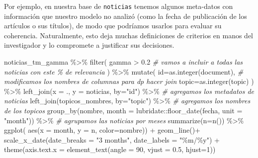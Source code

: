 \documentclass[
]{book}
\newenvironment{Shaded}{\begin{snugshade}}{\end{snugshade}}
\newcommand{\AttributeTok}[1]{\textcolor[rgb]{0.77,0.63,0.00}{#1}}
\newcommand{\CommentTok}[1]{\textcolor[rgb]{0.56,0.35,0.01}{\textit{#1}}}
\newcommand{\DecValTok}[1]{\textcolor[rgb]{0.00,0.00,0.81}{#1}}
\newcommand{\FloatTok}[1]{\textcolor[rgb]{0.00,0.00,0.81}{#1}}
\newcommand{\FunctionTok}[1]{\textcolor[rgb]{0.00,0.00,0.00}{#1}}
\newcommand{\NormalTok}[1]{#1}
\newcommand{\SpecialCharTok}[1]{\textcolor[rgb]{0.00,0.00,0.00}{#1}}
\newcommand{\StringTok}[1]{\textcolor[rgb]{0.31,0.60,0.02}{#1}}
\begin{document}
Por ejemplo, en nuestra base de \texttt{noticias} tenemos algunos meta-datos con información que nuestro modelo no analizó (como la fecha de publicación de los artículos o sus títulos), de modo que podríamos usarlos para evaluar su coherencia. Naturalmente, esto deja muchas definiciones de criterios en manos del investigador y lo compromete a justificar sus decisiones.

\begin{Shaded}
\begin{Highlighting}[]
\NormalTok{noticias\_tm\_gamma }\SpecialCharTok{\%\textgreater{}\%}
  \FunctionTok{filter}\NormalTok{(}
\NormalTok{    gamma }\SpecialCharTok{\textgreater{}} \FloatTok{0.2} \CommentTok{\# vamos a incluir a todas las noticias con este \% de relevancia}
\NormalTok{    ) }\SpecialCharTok{\%\textgreater{}\%} 
  \FunctionTok{mutate}\NormalTok{(}
    \AttributeTok{id=}\FunctionTok{as.integer}\NormalTok{(document), }\CommentTok{\# modificamos los nombres de columnas para dp hacer join}
    \AttributeTok{topic=}\FunctionTok{as.integer}\NormalTok{(topic)}
\NormalTok{    ) }\SpecialCharTok{\%\textgreater{}\%}
  \FunctionTok{left\_join}\NormalTok{(}\AttributeTok{x =}\NormalTok{ ., }\AttributeTok{y =}\NormalTok{ noticias, }\AttributeTok{by=}\StringTok{"id"}\NormalTok{) }\SpecialCharTok{\%\textgreater{}\%} \CommentTok{\# agregamos los metadatos de noticias}
  \FunctionTok{left\_join}\NormalTok{(topicos\_nombres, }\AttributeTok{by=}\StringTok{"topic"}\NormalTok{)  }\SpecialCharTok{\%\textgreater{}\%} \CommentTok{\# agregamos los nombres de los topicos}
  \FunctionTok{group\_by}\NormalTok{(nombre, }\AttributeTok{month =}\NormalTok{ lubridate}\SpecialCharTok{::}\FunctionTok{floor\_date}\NormalTok{(fecha, }\AttributeTok{unit =} \StringTok{"month"}\NormalTok{)) }\SpecialCharTok{\%\textgreater{}\%} \CommentTok{\# agrupamos las noticias por meses}
  \FunctionTok{summarize}\NormalTok{(}\AttributeTok{n=}\FunctionTok{n}\NormalTok{()) }\SpecialCharTok{\%\textgreater{}\%}
  \FunctionTok{ggplot}\NormalTok{( }\FunctionTok{aes}\NormalTok{(}\AttributeTok{x =}\NormalTok{ month, }\AttributeTok{y =}\NormalTok{ n, }\AttributeTok{color=}\NormalTok{nombre)) }\SpecialCharTok{+}
  \FunctionTok{geom\_line}\NormalTok{()}\SpecialCharTok{+}
  \FunctionTok{scale\_x\_date}\NormalTok{(}\AttributeTok{date\_breaks =} \StringTok{"3 months"}\NormalTok{, }\AttributeTok{date\_labels =} \StringTok{"\%m/\%y"}\NormalTok{) }\SpecialCharTok{+}
  \FunctionTok{theme}\NormalTok{(}\AttributeTok{axis.text.x =} \FunctionTok{element\_text}\NormalTok{(}\AttributeTok{angle =} \DecValTok{90}\NormalTok{, }\AttributeTok{vjust =} \FloatTok{0.5}\NormalTok{, }\AttributeTok{hjust=}\DecValTok{1}\NormalTok{))}
\end{Highlighting}
\end{Shaded}
\end{document}
